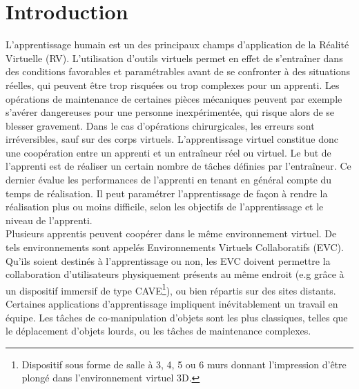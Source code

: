 \documentclass[11pt]{article}
\begin{document}
\section{Introduction}


L'apprentissage humain est un des principaux champs d'application de la Réalité Virtuelle (RV). L'utilisation d'outils virtuels permet en effet de s'entraîner dans des conditions favorables et paramétrables avant de se confronter à des situations réelles, qui peuvent être trop risquées ou trop complexes pour un apprenti. Les opérations de maintenance de certaines pièces mécaniques peuvent par exemple s'avérer dangereuses pour une personne inexpérimentée, qui risque alors de se blesser gravement. Dans le cas d'opérations chirurgicales, les erreurs sont irréversibles, sauf sur des corps virtuels. L'apprentissage virtuel constitue donc une coopération entre un apprenti et un entraîneur réel ou virtuel. Le but de l'apprenti est de réaliser un certain nombre de tâches définies par l'entraîneur. Ce dernier évalue les performances de l'apprenti en tenant en général compte du temps de réalisation. Il peut paramétrer l'apprentissage de façon à rendre la réalisation plus ou moins difficile, selon les objectifs de l'apprentissage et le niveau de l'apprenti.
\\

Plusieurs apprentis peuvent coopérer dans le même environnement virtuel. De tels environnements sont appelés Environnements Virtuels Collaboratifs (EVC). Qu'ils soient destinés à l'apprentissage ou non, les EVC doivent permettre la collaboration d'utilisateurs physiquement présents au même endroit (e.g grâce à un dispositif immersif de type CAVE\footnote{Dispositif sous forme de salle à 3, 4, 5 ou 6 murs donnant l'impression d'être plongé dans l'environnement virtuel 3D.}), ou bien répartis sur des sites distants. Certaines applications d'apprentissage impliquent inévitablement un travail en équipe. Les tâches de co-manipulation d'objets sont les plus classiques, telles que le déplacement d'objets lourds, ou les tâches de maintenance complexes.
\\
\end{document}
